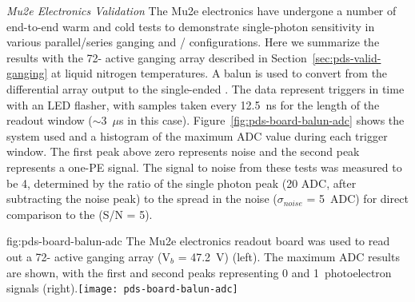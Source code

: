 \textit{Mu2e Electronics Validation}
The Mu2e electronics have undergone a number of end-to-end warm and cold tests to demonstrate single-photon sensitivity in various parallel/series ganging and / configurations. Here we summarize the results with the 72- active ganging array described in Section~\ref{sec:pds-valid-ganging}
at liquid nitrogen temperatures. 
A balun is used to convert from the differential  array output to the single-ended . The data represent triggers in time with an LED flasher, with samples taken every 12.5~ns for the length of the readout window ($\sim$3~$\mu$s in this case). Figure~\ref{fig:pds-board-balun-adc} shows the system used and a histogram of the maximum ADC value during each trigger window. The first peak above zero represents noise and the second peak represents a one-PE signal. The signal to noise from these tests was measured to be 4, determined by the ratio of the single photon peak (20 ADC, after subtracting the noise peak) to the spread in the noise ($\sigma_{noise}$ = 5~ADC) for direct comparison to the  (S/N = 5).

\begin{dunefigure}
{fig:pds-board-balun-adc}
{The Mu2e electronics readout board was used to read out a 72- active ganging array (V$_b$ = \SI{47.2}{V}) (left). The maximum ADC results are shown, with the first and second peaks representing 0 and 1~photoelectron signals (right).}\texttt{[image: pds-board-balun-adc]} 
\vspace{-7.0cm}
\end{dunefigure}



